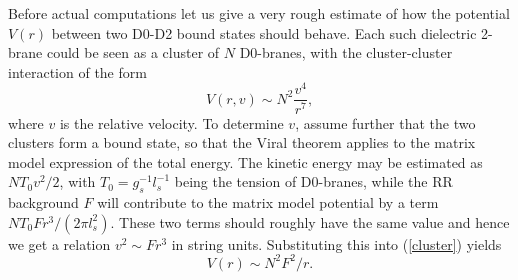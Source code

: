 \documentclass[a4paper,12pt]{article}
\begin{document}
Before actual computations let us give a very rough estimate of how the potential $V(r)$ between two D0-D2 bound states should behave. Each such dielectric 2-brane could be seen as a cluster of $N$ D0-branes, with the cluster-cluster interaction of the form \cite{DKPS}
\begin{equation}
V(r,v)\sim N^{2}\frac{v^{4}}{r^{7}},
\label{cluster}
\end{equation}
where $v$ is the relative velocity. To determine $v$, assume further that the two clusters form a bound state, so that the Viral theorem applies to the matrix model expression of the total energy. The kinetic energy may be estimated as $NT_{0}v^{2}/2$, with $T_{0}=g_{s}^{-1}l_{s}^{-1}$ being the tension of D0-branes, while the RR background $F$ will contribute to the matrix model potential by a term $NT_{0}Fr^{3}/(2\pi l_{s}^{2})$. These two terms should roughly have the same value and hence we get a relation $v^{2}\sim Fr^{3}$ in string units. Substituting this into (\ref{cluster}) yields
\begin{equation}
V(r)\sim N^{2}F^{2}/r.
\label{1/r}
\end{equation}
\end{document}
